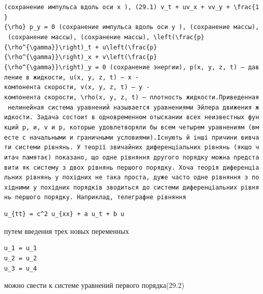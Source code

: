 \documentclass[
  ukrainian,
]{article}
\begin{document}
\texttt{(сохранение\ импульса\ вдоль\ оси\ \textquotesingle{}x\textquotesingle{}\ ),\ (29.1)\ \textquotesingle{}v\_t\ +\ uv\_x\ +\ vv\_y\ +\ \textbackslash{}frac\{1\}\{\textbackslash{}rho\}\ p\_y\ =\ 0\textquotesingle{}\ (сохранение\ импульса\ вдоль\ оси\ \textquotesingle{}y\textquotesingle{}\ ),\ (сохранение\ массы),\ (сохранение\ массы),\ (сохранение\ массы),\ \textquotesingle{}\textbackslash{}left(\textbackslash{}frac\{p\}\{\textbackslash{}rho\^{}\{\textbackslash{}gamma\}\}\textbackslash{}right)\_t\ +\ u\textbackslash{}left(\textbackslash{}frac\{p\}\{\textbackslash{}rho\^{}\{\textbackslash{}gamma\}\}\textbackslash{}right)\_x\ +\ v\textbackslash{}left(\textbackslash{}frac\{p\}\{\textbackslash{}rho\^{}\{\textbackslash{}gamma\}\}\textbackslash{}right)\_y\ =\ 0\textquotesingle{}\ (сохранение\ энергии),\ \textquotesingle{}p(x,\ y,\ z,\ t)\textquotesingle{}\ —\ давление\ в\ жидкости,\ \textquotesingle{}u(x,\ y,\ z,\ t)\textquotesingle{}\ —\ \textquotesingle{}x\textquotesingle{}\ -компонента\ скорости,\ \textquotesingle{}v(x,\ y,\ z,\ t)\textquotesingle{}\ —\ \textquotesingle{}y\textquotesingle{}\ -компонента\ скорости,\ \textquotesingle{}\textbackslash{}rho(x,\ y,\ z,\ t)\textquotesingle{}\ —\ плотность\ жидкости.Приведенная\ нелинейная\ система\ уравнений\ называется\ уравнениями\ Эйлера\ движения\ жидкости.\ Задача\ состоит\ в\ одновременном\ отыскании\ всех\ неизвестных\ функций\ р,\ и,\ v\ и\ р,\ которые\ удовлетворяли\ бы\ всем\ четырем\ уравнениям\ (вместе\ с\ начальными\ и\ граничными\ условиями).Існують\ й\ інші\ причини\ вивчати\ системи\ рівнянь.\ У\ теорії\ звичайних\ диференціальних\ рівнянь\ (якщо\ читач\ пам\textquotesingle{}ятає)\ показано,\ що\ одне\ рівняння\ другого\ порядку\ можна\ представити\ як\ систему\ з\ двох\ рівнянь\ першого\ порядку.\ Хоча\ теорія\ диференціальних\ рівнянь\ у\ похідних\ не\ така\ проста,\ дуже\ часто\ одне\ рівняння\ з\ похідними\ у\ похідних\ порядків\ зводиться\ до\ системи\ диференціальних\ рівнянь\ першого\ порядку.\ Наприклад,\ телеграфне\ рівняння}

\begin{verbatim}
u_{tt} = c^2 u_{xx} + a u_t + b u
\end{verbatim}

путем введения трех новых переменных

\begin{verbatim}
u_1 = u_1
u_2 = u_2
u_3 = u_4
\end{verbatim}

можно свести к системе уравнений первого порядка(29.2)
\end{document}
